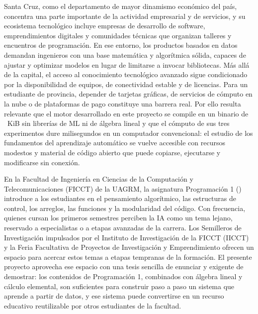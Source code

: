 Santa Cruz, como el departamento de mayor dinamismo económico del país, concentra una parte importante de la actividad empresarial y de servicios, y su ecosistema tecnológico incluye empresas de desarrollo de software, emprendimientos digitales y comunidades técnicas que organizan talleres y encuentros de programación. En ese entorno, los productos basados en datos demandan ingenieros con una base matemática y algorítmica sólida, capaces de ajustar y optimizar modelos en lugar de limitarse a invocar bibliotecas. Más allá de la capital, el acceso al conocimiento tecnológico avanzado sigue condicionado por la disponibilidad de equipos, de conectividad estable y de licencias. Para un estudiante de provincia, depender de tarjetas gráficas, de servicios de cómputo en la nube o de plataformas de pago constituye una barrera real. Por ello resulta relevante que el motor desarrollado en este proyecto se compile en un binario de \OfBinKiB{}~KiB sin librerías de ML ni de álgebra lineal y que el cómputo de sus tres experimentos dure milisegundos en un computador convencional: el estudio de los fundamentos del aprendizaje automático se vuelve accesible con recursos modestos y material de código abierto que puede copiarse, ejecutarse y modificarse sin conexión.

En la Facultad de Ingeniería en Ciencias de la Computación y Telecomunicaciones (FICCT) de la UAGRM, la asignatura Programación 1 (\Sigla) introduce a los estudiantes en el pensamiento algorítmico, las estructuras de control, los arreglos, las funciones y la modularidad del código. Con frecuencia, quienes cursan los primeros semestres perciben la IA como un tema lejano, reservado a especialistas o a etapas avanzadas de la carrera. Los Semilleros de Investigación impulsados por el Instituto de Investigación de la FICCT (IICCT) y la Feria Facultativa de Proyectos de Investigación y Emprendimiento ofrecen un espacio para acercar estos temas a etapas tempranas de la formación. El presente proyecto aprovecha ese espacio con una tesis sencilla de enunciar y exigente de demostrar: los contenidos de Programación 1, combinados con álgebra lineal y cálculo elemental, son suficientes para construir paso a paso un sistema que aprende a partir de datos, y ese sistema puede convertirse en un recurso educativo reutilizable por otros estudiantes de la facultad.

